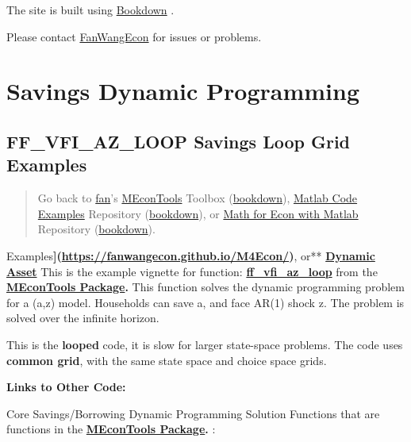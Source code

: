 \documentclass[
]{book}
\begin{document}
The site is built using \href{https://bookdown.org/}{Bookdown} \citep{R-bookdown}.

Please contact \href{https://fanwangecon.github.io/}{FanWangEcon} for issues or problems.

\hypertarget{savings-dynamic-programming}{%
\chapter{Savings Dynamic Programming}\label{savings-dynamic-programming}}

\hypertarget{ff_vfi_az_loop-savings-loop-grid-examples}{%
\section{FF\_VFI\_AZ\_LOOP Savings Loop Grid Examples}\label{ff_vfi_az_loop-savings-loop-grid-examples}}

\begin{quote}
Go back to \href{http://fanwangecon.github.io/}{fan}'s \href{https://fanwangecon.github.io/MEconTools/}{MEconTools} Toolbox (\href{https://fanwangecon.github.io/MEconTools/bookdown}{bookdown}), \href{https://fanwangecon.github.io/M4Econ/}{Matlab Code Examples} Repository (\href{https://fanwangecon.github.io/M4Econ/bookdown}{bookdown}), or \href{https://fanwangecon.github.io/Math4Econ/}{Math for Econ with Matlab} Repository (\href{https://fanwangecon.github.io/Math4Econ/bookdown}{bookdown}).
\end{quote}

Examples\textbf{{]}(\url{https://fanwangecon.github.io/M4Econ/})}, or** \href{https://fanwangecon.github.io/CodeDynaAsset/}{\textbf{Dynamic
Asset}}
This is the example vignette for function:
\href{https://github.com/FanWangEcon/MEconTools/blob/master/MEconTools/vfi/ff_vfi_az_loop.m}{\textbf{ff\_vfi\_az\_loop}}
from the \href{https://fanwangecon.github.io/MEconTools/}{\textbf{MEconTools
Package}}\textbf{.} This function
solves the dynamic programming problem for a (a,z) model. Households can
save a, and face AR(1) shock z. The problem is solved over the infinite
horizon.

This is the \textbf{looped} code, it is slow for larger state-space problems.
The code uses \textbf{common grid}, with the same state space and choice
space grids.

\textbf{Links to Other Code:}

Core Savings/Borrowing Dynamic Programming Solution Functions that are
functions in the \href{https://fanwangecon.github.io/MEconTools/}{\textbf{MEconTools
Package}}\textbf{.} :
\end{document}
